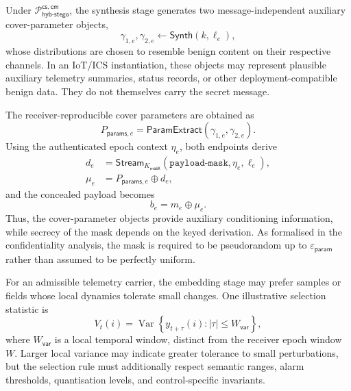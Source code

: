 \documentclass[journal]{IEEEtran}
\theoremstyle{definition}
\theoremstyle{game}
\begin{document}
Under
$\mathcal{P}^{\mathsf{cs,cm}}_{\mathsf{hyb\text{-}stego}}$,
the synthesis stage generates two message-independent auxiliary
cover-parameter objects,
\begin{equation}
\label{eq:iot-cover-parameters}
\gamma_{1,e},\gamma_{2,e}
\leftarrow
\mathsf{Synth}
\left(
k,\ell_e
\right),
\end{equation}
whose distributions are chosen to resemble benign content on
their respective channels. In an IoT/ICS instantiation, these
objects may represent plausible auxiliary telemetry summaries,
status records, or other deployment-compatible benign data. They
do not themselves carry the secret message.

The receiver-reproducible cover parameters are obtained as
\begin{equation}
\label{eq:iot-param-extract}
P_{\mathsf{params},e}
=
\mathsf{ParamExtract}
\left(
\gamma_{1,e},
\gamma_{2,e}
\right).
\end{equation}
Using the authenticated epoch context $\eta_e$, both endpoints
derive
\begin{align}
d_e&=\mathsf{Stream}_{K_{\mathsf{mask}}}
(\texttt{payload-mask},\eta_e,\ell_e),\\
\mu_e&=P_{\mathsf{params},e}\oplus d_e,
\label{eq:iot-qim-mask}
\end{align}
and the concealed payload becomes
\begin{equation}
\label{eq:iot-masked-payload}
b_e
=
m_e\oplus\mu_e.
\end{equation}
Thus, the cover-parameter objects provide auxiliary conditioning
information, while secrecy of the mask depends on the keyed
derivation. As formalised in the confidentiality analysis, the
mask is required to be pseudorandom up to
$\varepsilon_{\mathsf{param}}$ rather than assumed to be
perfectly uniform.

For an admissible telemetry carrier, the embedding stage may
prefer samples or fields whose local dynamics tolerate small
changes. One illustrative selection statistic is
\begin{equation}
\label{eq:var_map}
V_t(i)
=
\operatorname{Var}
\left\{
y_{t+\tau}(i):
|\tau|\leq W_{\mathsf{var}}
\right\},
\end{equation}
where $W_{\mathsf{var}}$ is a local temporal window, distinct from the
receiver epoch window $W$. Larger local variance
may indicate greater tolerance to small perturbations, but the
selection rule must additionally respect semantic ranges, alarm
thresholds, quantisation levels, and control-specific invariants.
\end{document}
